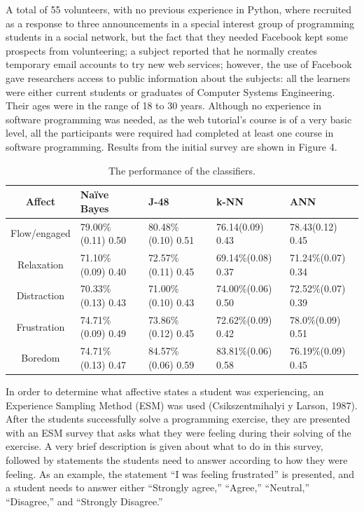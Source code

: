 \documentclass[conference]{IEEEtran}
\begin{document}
A total of 55 volunteers, with no previous experience in Python, where recruited
as a response to three announcements in a special interest group of programming
students in a social network, but the fact that they needed Facebook kept some prospects from
volunteering; a subject reported that he normally creates temporary email
accounts to try new web services; however, the use of Facebook gave researchers access to public
information about the subjects:  all the learners were either current students or
graduates of Computer Systems Engineering. Their ages were in the range of 18 to
30 years. Although no experience in software programming was needed, as the
web tutorial's course is of a very basic level, all the participants were
required had completed at least one course in software programming. Results from
the initial survey are shown in Figure 4. %
\begin{table}[!t]
\centering
\caption{The performance of the classifiers.}
    \begin{tabular}{ | c | l | l | l | l | }
    \hline
    Affect          & Naïve Bayes           & J-48                & k-NN              & ANN \\
    \hline
    Flow/engaged    & 79.00\% (0.11) 0.50   & 80.48\% (0.10) 0.51 & 76.14(0.09) 0.43    & 78.43(0.12) 0.45 \\
    \hline
    Relaxation      & 71.10\% (0.09) 0.40   & 72.57\% (0.11) 0.45 & 69.14\%(0.08)  0.37 & 71.24\%(0.07)  0.34\\
    \hline
    Distraction     & 70.33\% (0.13)  0.43  & 71.00\% (0.10) 0.43 & 74.00\%(0.06)  0.50 & 72.52\%(0.07)  0.39\\
    \hline
    Frustration     & 74.71\% (0.09) 0.49   & 73.86\% (0.12) 0.45 & 72.62\%(0.09)  0.42 & 78.0\%(0.09)  0.51 \\
    \hline
    Boredom         & 74.71\% (0.13) 0.47   & 84.57\% (0.06) 0.59 & 83.81\%(0.06)  0.58 & 76.19\%(0.09)  0.45\\
    \hline
    \end{tabular}
\end{table}



In order to determine what affective states a student was experiencing, an
Experience Sampling Method (ESM) was used (Csikszentmihalyi y Larson, 1987).
After the students successfully solve a programming exercise, they are presented
with an ESM survey that asks what they were feeling during their solving of the
exercise. A very brief description is given about what to do in this survey,
followed by statements the students need to answer according to how they were
feeling. As an example, the statement “I was feeling frustrated” is presented,
and a student needs to answer either “Strongly agree,” “Agree,” “Neutral,”
“Disagree,” and “Strongly Disagree.”
\end{document}
